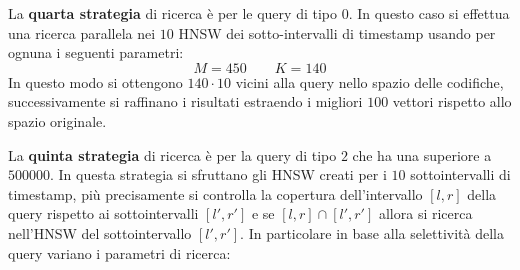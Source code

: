 La \textbf{quarta strategia} di ricerca è per le query di tipo $0$. In questo caso 
si effettua una ricerca parallela nei $10$ HNSW dei sotto-intervalli di timestamp 
usando per ognuna i seguenti parametri:
$$M=450 \qquad K=140$$
In questo modo si ottengono $140\cdot 10$ vicini alla query nello spazio delle 
codifiche, successivamente si raffinano i risultati estraendo i migliori $100$ 
vettori rispetto allo spazio originale.

La \textbf{quinta strategia} di ricerca è per la query di tipo $2$ che ha una 
superiore a $500000$. In questa strategia si sfruttano gli HNSW creati per i $10$
sottointervalli di timestamp, più precisamente si controlla la copertura dell'intervallo 
$[l,r]$ della query rispetto ai sottointervalli $[l',r']$ e se $[l,r]\cap [l',r']$ 
allora si ricerca nell'HNSW del sottointervallo $[l',r']$. 
In particolare in base alla selettività della query variano i parametri di ricerca:
